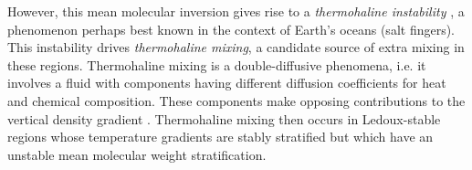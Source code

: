 



However, this mean molecular inversion gives rise to a \textit{thermohaline instability} \citep{CharbonnelZahn2007,CantielloLanger2010}, a phenomenon perhaps best known in the context of Earth's oceans (salt fingers). 
%
This instability drives \textit{thermohaline mixing}, a candidate source of extra mixing in these regions. 
Thermohaline mixing is a double-diffusive phenomena, i.e. it involves a fluid with components having different diffusion coefficients for heat and chemical composition. These components make opposing contributions to the vertical density gradient \citep{Turner:1974}. Thermohaline mixing then occurs in Ledoux-stable regions whose temperature gradients are stably stratified but which have an unstable mean molecular weight stratification.

